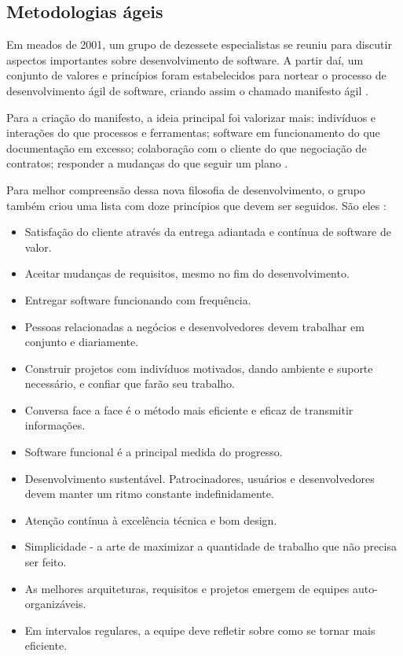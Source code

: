 \documentclass[quali]{ppgccufscar}
\begin{document}
\subsection{Metodologias ágeis}

Em meados de 2001, um grupo de dezessete especialistas se reuniu para discutir aspectos importantes sobre desenvolvimento de software. A partir daí, um conjunto de valores e princípios foram estabelecidos para nortear o processo de desenvolvimento ágil de software, criando assim o chamado manifesto ágil \cite{beck2001}.

Para a criação do manifesto, a ideia principal foi valorizar mais: indivíduos e interações do que processos e ferramentas; software em funcionamento do que documentação em excesso; colaboração com o cliente do que negociação de contratos; responder a mudanças do que seguir um plano \cite{beck2001}.

Para melhor compreensão dessa nova filosofia de desenvolvimento, o grupo também criou uma lista com doze princípios que devem ser seguidos. São eles \cite{beck2001}:

\begin{itemize}
	\item Satisfação do cliente através da entrega adiantada e contínua de software de valor.
	\item Aceitar mudanças de requisitos, mesmo no fim do desenvolvimento.
	\item Entregar software funcionando com frequência.
	\item Pessoas relacionadas a negócios e desenvolvedores devem trabalhar em conjunto e diariamente.
	\item Construir projetos com indivíduos motivados, dando ambiente e suporte necessário, e confiar que farão seu trabalho.
	\item Conversa face a face é o método mais eficiente e eficaz de transmitir informações.
	\item Software funcional é a principal medida do progresso.
	\item Desenvolvimento sustentável. Patrocinadores, usuários e desenvolvedores devem manter um ritmo constante indefinidamente.
	\item Atenção contínua à excelência técnica e bom design.
	\item Simplicidade - a arte de maximizar a quantidade de trabalho que não precisa ser feito.
	\item As melhores arquiteturas, requisitos e projetos emergem de equipes auto-organizáveis.
	\item Em intervalos regulares, a equipe deve refletir sobre como se tornar mais eficiente.
\end{itemize}
\end{document}
